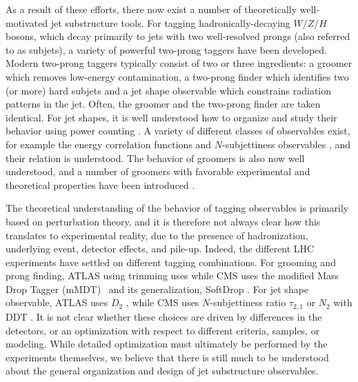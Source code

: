 \documentclass[11pt]{cernrep}
\begin{document}
As a result of these efforts, there now exist a number of theoretically well-motivated jet substructure tools.
%
For tagging hadronically-decaying $W/Z/H$ bosons, which decay primarily to jets with two well-resolved prongs (also referred to as subjets), a variety of powerful two-prong taggers have been developed.
%
Modern two-prong taggers typically consist of two or three
ingredients: a groomer which removes low-energy contamination, a
two-prong finder which identifies two (or more) hard subjets and a jet
shape observable which constrains radiation patterns in the
jet. Often, the groomer and the two-prong finder are taken identical.
%
%
For jet shapes, it is well understood how to organize and study their
behavior using power counting \cite{Larkoski:2014gra}.
%
A variety of
different classes of observables exist, for example the energy
correlation functions \cite{Larkoski:2013eya,Moult:2016cvt,Komiske:2017aww} and $N$-subjettiness
observables \cite{Thaler:2010tr,Thaler:2011gf}, and their relation is
understood.
%
The behavior of groomers is also now well understood, and
a number of groomers with favorable experimental and theoretical properties have been introduced
\cite{Dasgupta:2013ihk,Larkoski:2014wba}.

The
theoretical understanding of the behavior of tagging observables is primarily based on perturbation theory, and it is therefore
not always clear how this translates to experimental reality, due to
the presence of hadronization, underlying event, detector effects, and
pile-up.
%
Indeed, the different LHC experiments have settled on different
tagging combinations.
%
For grooming and prong finding, ATLAS using trimming \cite{Krohn:2009th} uses while CMS uses the modified
  Mass Drop Tagger (mMDT)~\cite{Butterworth:2008iy,Dasgupta:2013ihk} and its generalization, SoftDrop \cite{Larkoski:2014wba}.
  For jet shape observable, ATLAS uses $D_2$ \cite{Larkoski:2014gra,Larkoski:2015kga}, while CMS uses $N$-subjettiness ratio $\tau_{2,1}$ \cite{Thaler:2010tr,Thaler:2011gf} or $N_2$ \cite{Moult:2016cvt} with DDT \cite{Dolen:2016kst}.
  It is not clear whether these choices are driven by differences in the detectors, or an optimization with respect to different criteria, samples, or modeling. While detailed optimization must ultimately be performed by the experiments themselves, we believe that there is still much to be understood about the general organization and design of jet substructure observables.
\end{document}
